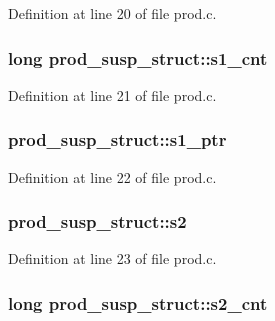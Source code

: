 Definition at line 20 of file prod.\+c.

\subsubsection[{\texorpdfstring{s1\+\_\+cnt}{s1_cnt}}]{\setlength{\rightskip}{0pt plus 5cm}long prod\+\_\+susp\+\_\+struct\+::s1\+\_\+cnt}\hypertarget{structprod__susp__struct_a7d2a3ceb8d128bdead09d6788e34ad85}{}\label{structprod__susp__struct_a7d2a3ceb8d128bdead09d6788e34ad85}


Definition at line 21 of file prod.\+c.

\subsubsection[{\texorpdfstring{s1\+\_\+ptr}{s1_ptr}}]{ prod\+\_\+susp\+\_\+struct\+::s1\+\_\+ptr}\hypertarget{structprod__susp__struct_a466b0db6723f203ec224ef9b4feabf7a}{}\label{structprod__susp__struct_a466b0db6723f203ec224ef9b4feabf7a}


Definition at line 22 of file prod.\+c.

\subsubsection[{\texorpdfstring{s2}{s2}}]{ prod\+\_\+susp\+\_\+struct\+::s2}\hypertarget{structprod__susp__struct_ac1a8cc77ec908d22cf176cf813aa209c}{}\label{structprod__susp__struct_ac1a8cc77ec908d22cf176cf813aa209c}


Definition at line 23 of file prod.\+c.

\subsubsection[{\texorpdfstring{s2\+\_\+cnt}{s2_cnt}}]{\setlength{\rightskip}{0pt plus 5cm}long prod\+\_\+susp\+\_\+struct\+::s2\+\_\+cnt}\hypertarget{structprod__susp__struct_a68146ef0285a3e2aac46436c3f326d56}{}\label{structprod__susp__struct_a68146ef0285a3e2aac46436c3f326d56}


